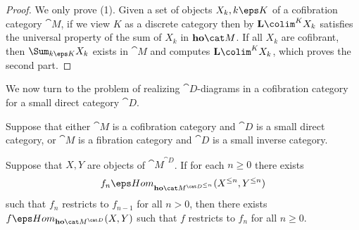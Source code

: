 \begin{proof}
We only prove (1). Given a set of objects $X_k, k \eps K$ of a cofibration category ${\cat M}$, if we view $K$ as a discrete category then by  ${\bf L}\colim^{K} X_k$ satisfies the universal property of the sum of $X_k$ in ${\bf ho}{\cat M}$. If all $X_k$ are cofibrant, then $\Sum_{k \eps K} X_k$ exists in ${\cat M}$ and computes ${\bf L}\colim^{K} X_k$, which proves the second part.
\end{proof}

We now turn to the problem of realizing ${\cat D}$-diagrams in a cofibration category for a small direct category ${\cat D}$.

\begin{lem}
\label{lem:sufficientfinitefull}
Suppose that either ${\cat M}$ is a cofibration category and ${\cat D}$ is a small direct category, or ${\cat M}$ is a fibration category and ${\cat D}$ is a small inverse category.

Suppose that $X, Y$ are objects of ${\cat M}^{\cat D}$. If for each $n \ge 0$ there exists 
\[
f_n \eps Hom_{{\bf ho}{{\cat M}^{{\cat D}^{\le n}}}} (X^{\le n}, Y^{\le n})
\]
 such that $f_{n}$ restricts to $f_{n-1}$ for all $n > 0$, then there exists $f \eps Hom_{{\bf ho}{{\cat M}^{{\cat D}}}} (X, Y)$ such that $f$ restricts to $f_n$ for all $n \ge 0$.
\end{lem}

